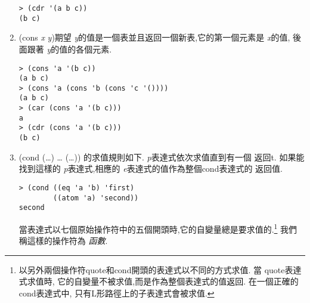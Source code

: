 \documentclass[12pt]{article}
\begin{document}
\begin{CJK}{UTF8}{bsmi}
\begin{enumerate}
\begin{verbatim} 
> (cdr '(a b c)) 
(b c) 
\end{verbatim} 
\item 
(cons 
{\it 
x} 
{\it 
y})期望{\it 
y}的值是一個表並且返回一個新表,它的第一個元素是{\it 
x}的值, 
後 
面跟著{\it 
y}的值的各個元素. 
\begin{verbatim} 
> (cons 'a '(b c)) 
(a b c) 
> (cons 'a (cons 'b (cons 'c '()))) 
(a b c) 
> (car (cons 'a '(b c))) 
a 
> (cdr (cons 'a '(b c))) 
(b c) 
\end{verbatim} 
\item 
(cond 
(\pone\dots\eone) 
\dots 
(\pn\dots\en)) 
的求值規則如下. 
{\it 
p}表達式依次求值直到有一個 
返回t. 
如果能找到這樣的{\it 
p}表達式,相應的{\it 
e}表達式的值作為整個cond表達式的 
返回值. 
\begin{verbatim} 
> (cond ((eq 'a 'b) 'first) 
        ((atom 'a) 'second)) 
second 
\end{verbatim} 
當表達式以七個原始操作符中的五個開頭時,它的自變量總是要求值的.\footnote{以另外兩個操作符quote和cond開頭的表達式以不同的方式求值. 
當 
quote表達式求值時, 
它的自變量不被求值,而是作為整個表達式的值返回. 
在一個正確的cond表達式中, 
只有L形路徑上的子表達式會被求值.} 
我們稱這樣的操作符為{\em 
函數}. 
\end{enumerate} 

\end{CJK}
\end{document}
